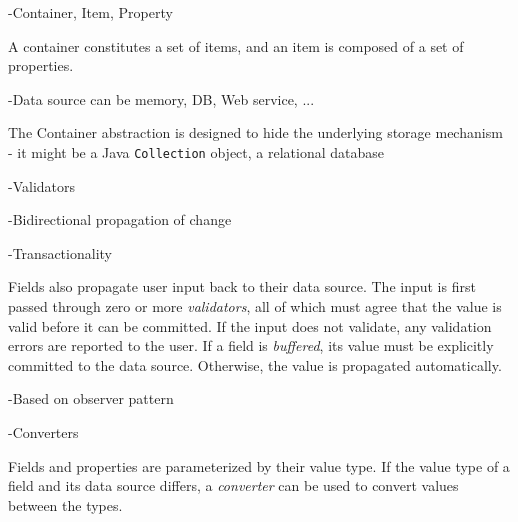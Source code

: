 -Container, Item, Property

A container constitutes a set of items, and an item is composed of a set of properties.

-Data source can be memory, DB, Web service, ...

The Container abstraction is designed to hide the underlying storage mechanism - it might be a Java \texttt{Collection} object, a relational database

-Validators

-Bidirectional propagation of change

-Transactionality

Fields also propagate user input back to their data source. The input is first passed through zero or more \emph{validators}, all of which must agree that the value is valid before it can be committed. If the input does not validate, any validation errors are reported to the user. If a field is \emph{buffered}, its value must be explicitly committed to the data source. Otherwise, the value is propagated automatically.

-Based on observer pattern

-Converters

Fields and properties are parameterized by their value type. If the value type of a field and its data source differs, a \emph{converter} can be used to convert values between the types.
